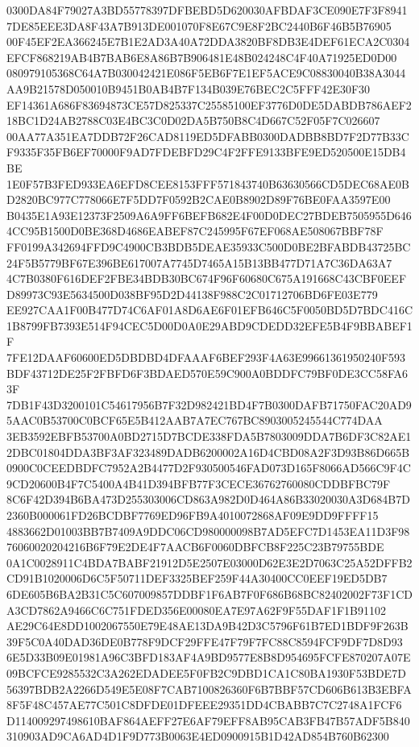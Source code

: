 \documentclass[UTF8,fontset=fandol,zihao=-4,a4paper]{ctexart}
\begin{document}
{{0300DA84F79027A3BD55778397DFBEBD5D620030AFBDAF3CE090E7F3F89417DE85EEE3DA8F43A7B913DE001070F8E67C9E8F2BC2440B6F46B5B76905
00F45EF2EA366245E7B1E2AD3A40A72DDA3820BF8DB3E4DEF61ECA2C0304EFCF868219AB4B7BAB6E8A86B7B906481E48B024248C4F40A71925ED0D00
080979105368C64A7B030042421E086F5EB6F7E1EF5ACE9C08830040B38A3044AA9B21578D050010B9451B0AB4B7F134B039E76BEC2C5FFF42E30F30
EF14361A686F83694873CE57D825337C25585100EF3776D0DE5DABDB786AEF218BC1D24AB2788C03E4BC3C0D02DA5B750B8C4D667C52F05F7C026607
00AA77A351EA7DDB72F26CAD8119ED5DFABB0300DADBB8BD7F2D77B33CF9335F35FB6EF70000F9AD7FDEBFD29C4F2FFE9133BFE9ED520500E15DB4BE
1E0F57B3FED933EA6EFD8CEE8153FFF571843740B63630566CD5DEC68AE0BD2820BC977C778066E7F5DD7F0592B2CAE0B8902D89F76BE0FAA3597E00
B0435E1A93E12373F2509A6A9FF6BEFB682E4F00D0DEC27BDEB7505955D6464CC95B1500D0BE368D4686EABEF87C245995F67EF068AE508067BBF78F
FF0199A342694FFD9C4900CB3BDB5DEAE35933C500D0BE2BFABDB43725BC24F5B5779BF67E396BE617007A7745D7465A15B13BB477D71A7C36DA63A7
4C7B0380F616DEF2FBE34BDB30BC674F96F60680C675A191668C43CBF0EEFD89973C93E5634500D038BF95D2D44138F988C2C01712706BD6FE03E779
EE927CAA1F00B477D74C6AF01A8D6AE6F01EFB646C5F0050BD5D7BDC416C1B8799FB7393E514F94CEC5D00D0A0E29ABD9CDEDD32EFE5B4F9BBABEF1F
7FE12DAAF60600ED5DBDBD4DFAAAF6BEF293F4A63E99661361950240F593BDF43712DE25F2FBFD6F3BDAED570E59C900A0BDDFC79BF0DE3CC58FA63F
7DB1F43D3200101C54617956B7F32D982421BD4F7B0300DAFB71750FAC20AD95AAC0B53700C0BCF65E5B412AAB7A7EC767BC8903005245544C774DAA
3EB3592EBFB53700A0BD2715D7BCDE338FDA5B7803009DDA7B6DF3C82AE12DBC01804DDA3BF3AF323489DADB6200002A16D4CBD08A2F3D93B86D665B
0900C0CEEDBDFC7952A2B4477D2F930500546FAD073D165F8066AD566C9F4C9CD20600B4F7C5400A4B41D394BFB77F3CECE36762760080CDDBFBC79F
8C6F42D394B6BA473D255303006CD863A982D0D464A86B33020030A3D684B7D2360B000061FD26BCDBF7769ED96FB9A4010072868AF09E9DD9FFFF15
4883662D01003BB7B7409A9DDC06CD980000098B7AD5EFC7D1453EA11D3F9876060020204216B6F79E2DE4F7AACB6F0060DBFCB8F225C23B79755BDE
0A1C0028911C4BDA7BABF21912D5E2507E03000D62E3E2D7063C25A52DFFB2CD91B1020006D6C5F50711DEF3325BEF259F44A30400CC0EEF19ED5DB7
6DE605B6BA2B31C5C607009857DDBF1F6AB7F0F686B68BC82402002F73F1CDA3CD7862A9466C6C751FDED356E00080EA7E97A62F9F55DAF1F1B91102
AE29C64E8DD1002067550E79E48AE13DA9B42D3C5796F61B7ED1BDF9F263B39F5C0A40DAD36DE0B778F9DCF29FFE47F79F7FC88C8594FCF9DF7D8D93
6E5D33B09E01981A96C3BFD183AF4A9BD9577E8B8D954695FCFE870207A07E09BCFCE9285532C3A262EDADEE5F0FB2C9DBD1CA1C80BA1930F53BDE7D
56397BDB2A2266D549E5E08F7CAB7100826360F6B7BBF57CD606B613B3EBFA8F5F48C457AE77C501C8DFDE01DFEEE29351DD4CBABB7C7C2748A1FCF6
D114009297498610BAF864AEFF27E6AF79EFF8AB95CAB3FB47B57ADF5B840310903AD9CA6AD4D1F9D773B0063E4ED0900915B1D42AD854B760B62300
}}
\end{document}
